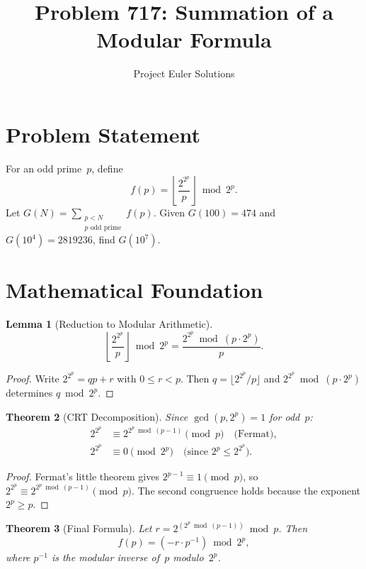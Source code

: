 \documentclass[11pt]{article}
\title{Problem 717: Summation of a Modular Formula}
\author{Project Euler Solutions}
\date{}
\newtheorem{theorem}{Theorem}
\newtheorem{lemma}[theorem]{Lemma}
\begin{document}
\maketitle

\section{Problem Statement}

For an odd prime~$p$, define
\[
f(p) = \left\lfloor \frac{2^{2^p}}{p} \right\rfloor \bmod 2^p.
\]
Let $\displaystyle G(N) = \sum_{\substack{p < N \\ p \text{ odd prime}}} f(p)$. Given $G(100) = 474$ and $G(10^4)=2819236$, find $G(10^7)$.

\section{Mathematical Foundation}

\begin{lemma}[Reduction to Modular Arithmetic]
\[
\left\lfloor \frac{2^{2^p}}{p} \right\rfloor \bmod 2^p = \frac{2^{2^p} \bmod (p \cdot 2^p)}{p}.
\]
\end{lemma}

\begin{proof}
Write $2^{2^p} = qp + r$ with $0 \le r < p$. Then $q = \lfloor 2^{2^p}/p\rfloor$ and $2^{2^p} \bmod (p \cdot 2^p)$ determines $q \bmod 2^p$.
\end{proof}

\begin{theorem}[CRT Decomposition]
Since $\gcd(p, 2^p) = 1$ for odd~$p$:
\begin{align*}
2^{2^p} &\equiv 2^{2^p \bmod (p-1)} \pmod{p} \quad\text{(Fermat)},\\
2^{2^p} &\equiv 0 \pmod{2^p} \quad\text{(since $2^p \le 2^{2^p}$)}.
\end{align*}
\end{theorem}

\begin{proof}
Fermat's little theorem gives $2^{p-1} \equiv 1 \pmod{p}$, so $2^{2^p} \equiv 2^{2^p \bmod (p-1)} \pmod{p}$. The second congruence holds because the exponent $2^p \ge p$.
\end{proof}

\begin{theorem}[Final Formula]
Let $r = 2^{(2^p \bmod (p-1))} \bmod p$. Then
\[
f(p) = (-r \cdot p^{-1}) \bmod 2^p,
\]
where $p^{-1}$ is the modular inverse of~$p$ modulo~$2^p$.
\end{theorem}
\end{document}
